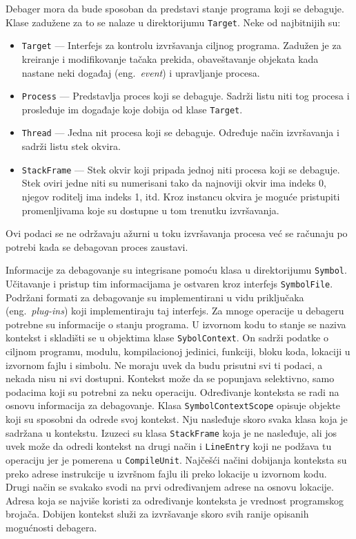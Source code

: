 \documentclass[12pt,oneside]{memoir}
\begin{document}
Debager mora da bude sposoban da predstavi stanje programa koji se debaguje.
Klase zadužene za to se nalaze u direktorijumu \verb|Target|.
Neke od najbitnijih su:
\begin{itemize}
  \item \verb|Target| --- Interfejs za kontrolu izvršavanja ciljnog programa. Zadužen je za kreiranje i modifikovanje tačaka prekida, obaveštavanje objekata kada nastane neki događaj (eng.~{\em event}) i upravljanje procesa.
  \item \verb|Process| --- Predstavlja proces koji se debaguje. Sadrži listu niti tog procesa i prosleđuje im događaje koje dobija od klase \verb|Target|.
  \item \verb|Thread| --- Jedna nit procesa koji se debaguje. Određuje način izvršavanja i sadrži listu stek okvira.
  \item \verb|StackFrame| --- Stek okvir koji pripada jednoj niti procesa koji se debaguje. Stek oviri jedne niti su numerisani tako da najnoviji okvir ima indeks 0, njegov roditelj ima indeks 1, itd. Kroz instancu okvira je moguće pristupiti promenljivama koje su dostupne u tom trenutku izvršavanja.
\end{itemize}
Ovi podaci se ne održavaju ažurni u toku izvršavanja procesa već se računaju po potrebi kada se debagovan proces zaustavi.

Informacije za debagovanje su integrisane pomoću klasa u direktorijumu \verb|Symbol|.
Učitavanje i pristup tim informacijama je ostvaren kroz interfejs \verb|SymbolFile|.
Podržani formati za debagovanje su implementirani u vidu priključaka (eng.~{\em plug-ins}) koji implementiraju taj interfejs.
Za mnoge operacije u debageru potrebne su informacije o stanju programa.
U izvornom kodu to stanje se naziva kontekst i skladišti se u objektima klase \verb|SybolContext|.
On sadrži podatke o ciljnom programu, modulu, kompilacionoj jedinici, funkciji, bloku koda, lokaciji u izvornom fajlu i simbolu.
Ne moraju uvek da budu prisutni svi ti podaci, a nekada nisu ni svi dostupni.
Kontekst može da se popunjava selektivno, samo podacima koji su potrebni za neku operaciju.
Određivanje konteksta se radi na osnovu informacija za debagovanje.
Klasa \verb|SymbolContextScope| opisuje objekte koji su sposobni da odrede svoj kontekst.
Nju nasleđuje skoro svaka klasa koja je sadržana u kontekstu.
Izuzeci su klasa \verb|StackFrame| koja je ne nasleđuje, ali jos uvek može da odredi kontekst na drugi način i \verb|LineEntry| koji ne podžava tu operaciju jer je pomerena u \verb|CompileUnit|.
Najčešći načini dobijanja konteksta su preko adrese instrukcije u izvršnom fajlu ili preko lokacije u izvornom kodu.
Drugi način se svakako svodi na prvi određivanjem adrese na osnovu lokacije.
Adresa koja se najviše koristi za određivanje konteksta je vrednost programskog brojača.
Dobijen kontekst služi za izvršavanje skoro svih ranije opisanih mogućnosti debagera.
\end{document}
